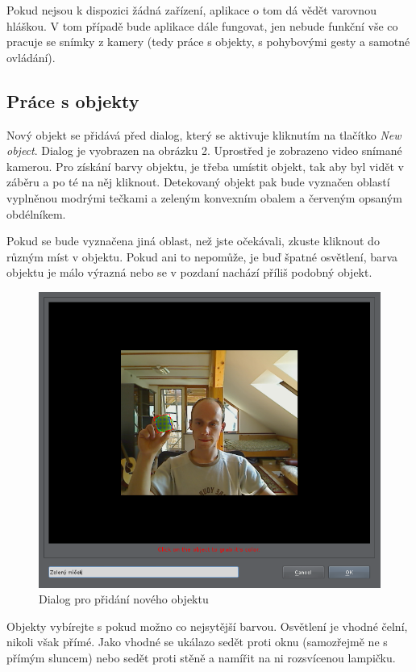 Pokud nejsou k dispozici žádná zařízení, aplikace o tom dá vědět varovnou
hláškou. V tom případě bude aplikace dále fungovat, jen nebude funkční vše co
pracuje se snímky z kamery (tedy práce s objekty, s pohybovými gesty a samotné
ovládání).

\subsection{Práce s objekty}
Nový objekt se přidává před dialog, který se aktivuje kliknutím na tlačítko
\emph{New object}. Dialog je vyobrazen na obrázku 2. Uprostřed je zobrazeno
video snímané kamerou. Pro získání barvy objektu, je třeba umístit objekt, tak
aby byl vidět v záběru a po té na něj kliknout. Detekovaný objekt pak bude
vyznačen oblastí vyplněnou modrými tečkami a zeleným konvexním obalem a
červeným opsaným obdélníkem.

Pokud se bude vyznačena jiná oblast, než jste očekávali, zkuste kliknout do
různým míst v objektu. Pokud ani to nepomůže, je buď špatné osvětlení, barva
objektu je málo výrazná nebo se v pozdaní nachází příliš podobný objekt.

\begin{figure}[h]
\centering
\includegraphics[width=\textwidth]{newobject.png}
\caption{Dialog pro přidání nového objektu}
\end{figure}

Objekty vybírejte s pokud možno co nejsytější barvou. Osvětlení je vhodné
čelní, nikoli však přímé. Jako vhodné se ukálazo sedět proti oknu (samozřejmě
ne s přímým sluncem) nebo sedět proti stěně a namířit na ni rozsvícenou
lampičku.

